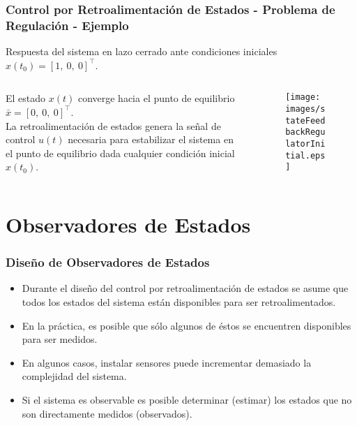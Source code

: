 \documentclass[aspectratio=169,handout]{beamer}
\theoremstyle{definition}
\theoremstyle{plain}
\theoremstyle{remark}
\begin{document}
\begin{frame}[c]\frametitle{Control por Retroalimentación de Estados - Problema de Regulación - Ejemplo}
	\small
	Respuesta del sistema en lazo cerrado ante condiciones iniciales $x(t_0) = [1,\ 0,\ 0]^\intercal$.
	\vspace{-5mm}
	\begin{columns}
		\begin{column}{0.4\textwidth}
			El estado $x(t)$ converge hacia el punto de equilibrio $\bar{x} = [0,\ 0,\ 0]^\intercal$.\\
			\vspace{3mm}
			La retroalimentación de estados genera la señal de control $u(t)$ necesaria para estabilizar el sistema en el punto de equilibrio dada cualquier condición inicial $x(t_0)$.
		\end{column}
		\begin{column}{0.6\textwidth}
			\begin{figure}
				\centering
				\texttt{[image: images/stateFeedbackRegulatorInitial.eps]}
			\end{figure}
		\end{column}
	\end{columns}
\end{frame}

\section{Observadores de Estados}
\begin{frame}[<+->]\frametitle{Diseño de Observadores de Estados}
	\begin{itemize}
		\item Durante el diseño del control por retroalimentación de estados se asume que todos los estados del sistema están disponibles para ser retroalimentados.
		\item En la práctica, es posible que sólo algunos de éstos se encuentren disponibles para ser medidos.
		\item En algunos casos, instalar sensores puede incrementar demasiado la complejidad del sistema.
		\item Si el sistema es observable es posible determinar (estimar) los estados que no son directamente medidos (observados).
	\end{itemize}
\end{frame}
\end{document}
